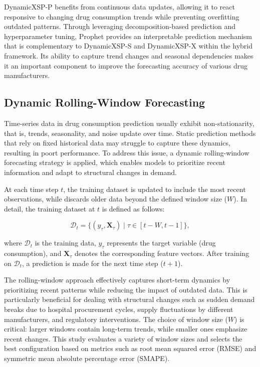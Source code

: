 \documentclass[journal]{IEEEtran}
\begin{document}
DynamicXSP-P benefits from continuous data updates, allowing it to react responsive to changing drug consumption trends while preventing overfitting outdated patterns. Through leveraging decomposition-based prediction and hyperparameter tuning, Prophet provides an interpretable prediction mechanism that is complementary to DynamicXSP-S and DynamicXSP-X within the hybrid framework. Its ability to capture trend changes and seasonal dependencies makes it an important component to improve the forecasting accuracy of various drug manufacturers.

\subsection{Dynamic Rolling-Window Forecasting}

Time-series data in drug consumption prediction usually exhibit non-stationarity, that is, trends, seasonality, and noise update over time. Static prediction methods that rely on fixed historical data may struggle to capture these dynamics, resulting in poort performance. To address this issue, a dynamic rolling-window forecasting strategy is applied, which enables models to prioritize recent information and adapt to structural changes in demand.

At each time step \(t\), the training dataset is updated to include the most recent observations, while discards older data beyond the defined window size (\(W\)). In detail, the training dataset at \(t\) is defined as follows:

\[
\mathcal{D}_{t} = \{(y_{\tau}, \mathbf{X}_{\tau}) \mid \tau \in [t - W, t-1]\},
\]

where \(\mathcal{D}_{t}\) is the training data, \(y_{\tau}\) represents the target variable (drug consumption), and \(\mathbf{X}_{\tau}\)  denotes the corresponding feature vectors. After training on \(\mathcal{D}_{t}\), a prediction is made for the next time step (\(t+1\)).

The rolling-window approach effectively captures short-term dynamics by prioritizing recent patterns while reducing the impact of outdated data. This is particularly beneficial for dealing with structural changes such as sudden demand breaks due to hospital procurement cycles, supply fluctuations by different manufacturers, and regulatory interventions. The choice of window size (\(W\)) is critical: larger windows contain long-term trends, while smaller ones emphasize recent changes. This study evaluates a variety of window sizes and selects the best configuration based on metrics such as root mean squared error (RMSE) and symmetric mean absolute percentage error (SMAPE).
\end{document}
